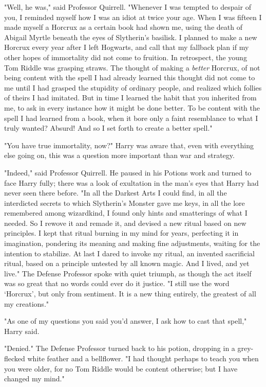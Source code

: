 "Well, he was," said Professor Quirrell. "Whenever I was tempted to despair of
you, I reminded myself how I was an idiot at twice your age. When I was fifteen
I made myself a Horcrux as a certain book had shown me, using the death of
Abigail Myrtle beneath the eyes of Slytherin's basilisk. I planned to make a
new Horcrux every year after I left Hogwarts, and call that my fallback plan if
my other hopes of immortality did not come to fruition. In retrospect, the
young Tom Riddle was grasping straws. The thought of making a \emph{better}
Horcrux, of not being content with the spell I had already learned{\el} this
thought did not come to me until I had grasped the stupidity of ordinary
people, and realized which follies of theirs I had imitated. But in time I
learned the habit that you inherited from me, to ask in every instance how it
might be done better. To be content with the spell I had learned from a book,
when it bore only a faint resemblance to what I truly wanted? Absurd! And so I
set forth to create a better spell."

"You have true immortality, now?" Harry was aware that, even with everything
else going on, this was a question more important than war and strategy.

"Indeed," said Professor Quirrell. He paused in his Potions work and turned to
face Harry fully; there was a look of exultation in the man's eyes that Harry
had never seen there before. "In all the Darkest Arts I could find, in all the
interdicted secrets to which Slytherin's Monster gave me keys, in all the lore
remembered among wizardkind, I found only hints and smatterings of what I
needed. So I rewove it and remade it, and devised a new ritual based on new
principles. I kept that ritual burning in my mind for years, perfecting it in
imagination, pondering its meaning and making fine adjustments, waiting for the
intention to stabilize. At last I dared to invoke my ritual, an invented
sacrificial ritual, based on a principle untested by all known magic. And I
lived, and yet live." The Defense Professor spoke with quiet triumph, as though
the act itself was so great that no words could ever do it justice. "I still
use the word `Horcrux', but only from sentiment. It is a new thing entirely,
the greatest of all my creations."

"As one of my questions you said you'd answer, I ask how to cast that spell,"
Harry said.

"Denied." The Defense Professor turned back to his potion, dropping in a
grey-flecked white feather and a bellflower. "I had thought perhaps to teach
you when you were older, for no Tom Riddle would be content otherwise; but I
have changed my mind."

